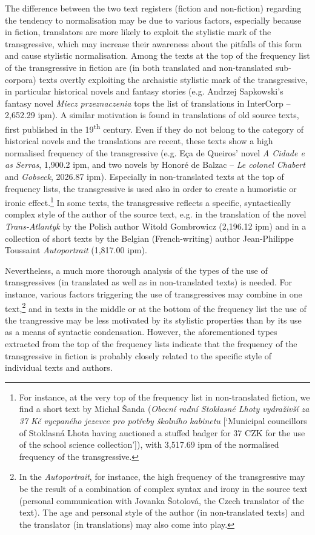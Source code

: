 \documentclass[output=paper,russian]{langsci/langscibook}
\begin{document}
The difference between the two text registers (fiction and non-fiction) regarding the tendency to normalisation may be due to various factors, especially because in fiction, translators are more likely to exploit the stylistic mark of the transgressive, which may increase their awareness about the pitfalls of this form and cause stylistic normalisation. Among the texts at the top of the frequency list of the transgressive in fiction are (in both translated and non-translated sub-corpora) texts overtly exploiting the archaistic stylistic mark of the transgressive, in particular historical novels and fantasy stories (e.g. Andrzej Sapkowski’s fantasy novel \textit{Miecz przeznaczenia} tops the list of translations in InterCorp -- 2,652.29 ipm). A similar motivation is found in translations of old source texts, first published in the 19\textsuperscript{th} century. Even if they do not belong to the category of historical novels and the translations are recent, these texts show a high normalised frequency of the transgressive (e.g. Eça de Queiros' novel \textit{A Cidade e as Serras}, 1,900.2 ipm, and two novels by Honoré de Balzac -- \textit{Le colonel Chabert} and \textit{Gobseck}, 2026.87 ipm). Especially in non-translated texts at the top of frequency lists, the transgressive is used also in order to create a humoristic or ironic effect.\footnote{For instance, at the very top of the frequency list in non-translated fiction, we find a short text by Michal Šanda (\textit{Obecní radní Stoklasné Lhoty vydraživší za 37 Kč vycpaného jezevce pro potřeby školního kabinetu} [`Municipal councillors of Stoklasná Lhota having auctioned a stuffed badger for 37 CZK for the use of the school science collection']), with 3,517.69 ipm of the normalised frequency of the transgressive.} In some texts, the transgressive reflects a specific, syntactically complex style of the author of the source text, e.g. in the translation of the novel \textit{Trans-Atlantyk} by the Polish author Witold Gombrowicz (2,196.12 ipm) and in a collection of short texts by the Belgian (French-writing) author Jean-Philippe Toussaint \textit{Autoportrait} (1,817.00 ipm). 

Nevertheless, a much more thorough analysis of the types of the use of transgressives (in translated as well as in non-translated texts) is needed. For instance, various factors triggering the use of transgressives may combine in one text,\footnote{In the \textit{Autoportrait}, for instance, the high frequency of the transgressive may be the result of a combination of complex syntax and irony in the source text (personal communication with Jovanka Šotolová, the Czech translator of the text). The age and personal style of the author (in non-translated texts) and the translator (in translations) may also come into play.} and in texts in the middle or at the bottom of the frequency list the use of the trangressive may be less motivated by its stylistic properties than by its use as a means of syntactic condensation. However, the aforementioned types extracted from the top of the frequency lists indicate that the frequency of the transgressive in fiction is probably closely related to the specific style of individual texts and authors. 
\end{document}
